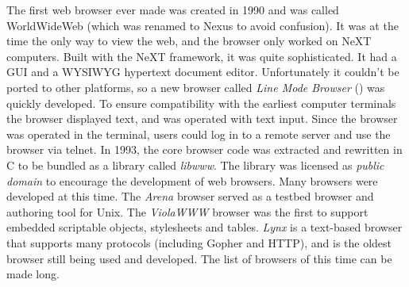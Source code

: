     The first \gls{web} \gls{browser} ever made was created in 1990 and was called WorldWideWeb (which was renamed to Nexus to avoid confusion).
    It was at the time the only way to view the \gls{web}, and the \gls{browser} only worked on NeXT computers.
    Built with the NeXT framework, it was quite sophisticated.
    It had a \gls{GUI} and a \gls{WYSIWYG} \gls{hypertext} \gls{document} editor.
    Unfortunately it couldn't be ported to other platforms, so a new \gls{browser} called \emph{Line Mode Browser} () was quickly developed.
    To ensure compatibility with the earliest computer terminals the \gls{browser} displayed text, and was operated with text input.
    Since the \gls{browser} was operated in the terminal, users could log in to a remote server and use the \gls{browser} via telnet.
    In 1993, the core browser code was extracted and rewritten in C to be bundled as a library called \emph{libwww}.
    The library was licensed as \emph{public domain} to encourage the development of \gls{web} \glspl{browser}.
    Many \glspl{browser} were developed at this time.
    The \emph{Arena} \gls{browser} served as a testbed \gls{browser} and authoring tool for Unix.
    The \emph{ViolaWWW} \gls{browser} was the first to support embedded scriptable objects, stylesheets and tables.
    \emph{Lynx} is a text-based \gls{browser} that supports many protocols (including Gopher and \gls{HTTP}), and is the oldest \gls{browser} still being used and developed.
    The list of \glspl{browser} of this time can be made long.

